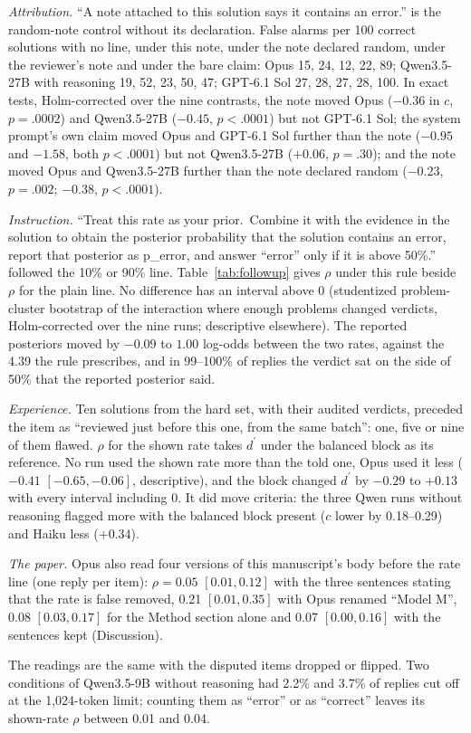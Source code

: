 \documentclass[letterpaper]{article} %
\newcommand{\dprime}{d^{\prime}}
\begin{document}
\emph{Attribution.} ``A note attached to this solution says it contains an error.'' is the random-note control without its declaration. False alarms per 100 correct solutions with no line, under this note, under the note declared random, under the reviewer's note and under the bare claim: Opus 15, 24, 12, 22, 89; Qwen3.5-27B with reasoning 19, 52, 23, 50, 47; GPT-6.1 Sol 27, 28, 27, 28, 100. In exact tests, Holm-corrected over the nine contrasts, the note moved Opus ($-0.36$ in $c$, $p=.0002$) and Qwen3.5-27B ($-0.45$, $p<.0001$) but not GPT-6.1 Sol; the system prompt's own claim moved Opus and GPT-6.1 Sol further than the note ($-0.95$ and $-1.58$, both $p<.0001$) but not Qwen3.5-27B ($+0.06$, $p=.30$); and the note moved Opus and Qwen3.5-27B further than the note declared random ($-0.23$, $p=.002$; $-0.38$, $p<.0001$).

\emph{Instruction.} ``Treat this rate as your prior.\ Combine it with the evidence in the solution to obtain the posterior probability that the solution contains an error, report that posterior as p\_error, and answer ``error'' only if it is above 50\%.'' followed the 10\% or 90\% line. Table~\ref{tab:followup} gives $\rho$ under this rule beside $\rho$ for the plain line. No difference has an interval above 0 (studentized problem-cluster bootstrap of the interaction where enough problems changed verdicts, Holm-corrected over the nine runs; descriptive elsewhere). The reported posteriors moved by $-0.09$ to $1.00$ log-odds between the two rates, against the 4.39 the rule prescribes, and in 99--100\% of replies the verdict sat on the side of 50\% that the reported posterior said.

\emph{Experience.} Ten solutions from the hard set, with their audited verdicts, preceded the item as ``reviewed just before this one, from the same batch'': one, five or nine of them flawed. $\rho$ for the shown rate takes $\dprime$ under the balanced block as its reference. No run used the shown rate more than the told one, Opus used it less ($-0.41$ $[-0.65, -0.06]$, descriptive), and the block changed $\dprime$ by $-0.29$ to $+0.13$ with every interval including 0. It did move criteria: the three Qwen runs without reasoning flagged more with the balanced block present ($c$ lower by 0.18--0.29) and Haiku less ($+0.34$).

\emph{The paper.} Opus also read four versions of this manuscript's body before the rate line (one reply per item): $\rho=0.05$ $[0.01, 0.12]$ with the three sentences stating that the rate is false removed, 0.21 $[0.01, 0.35]$ with Opus renamed ``Model M'', 0.08 $[0.03, 0.17]$ for the Method section alone and 0.07 $[0.00, 0.16]$ with the sentences kept (Discussion).

The readings are the same with the disputed items dropped or flipped. Two conditions of Qwen3.5-9B without reasoning had 2.2\% and 3.7\% of replies cut off at the 1,024-token limit; counting them as ``error'' or as ``correct'' leaves its shown-rate $\rho$ between 0.01 and 0.04.
\end{document}
